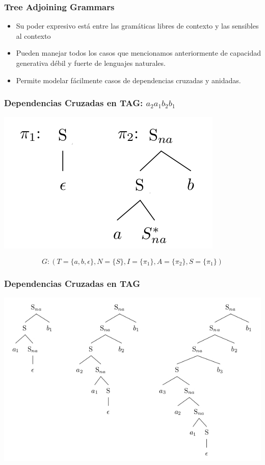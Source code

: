 \documentclass[compress,color=usenames]{beamer}
\begin{document}
\begin{frame}
\frametitle{Tree Adjoining Grammars}

\begin{itemize}
\item Su poder expresivo est\'a entre las gram\'aticas libres de contexto y 
las sensibles al contexto

\item Pueden manejar todos los casos que mencionamos anteriormente de capacidad
generativa d\'ebil y fuerte de lenguajes naturales. 

\item Permite modelar f\'acilmente casos de dependencias cruzadas y anidadas.

\end{itemize}
\end{frame}

\begin{frame}
\frametitle{Dependencias Cruzadas en TAG: $a_2a_1b_2b_1$}

\begin{center}
\includegraphics[scale=.4]{pics/pic2-4.jpg}
\end{center}

$$G : (T = \{a, b,\epsilon \}, N = \{S \}, I = \{\pi_1\}, A = \{\pi_2\}, S = \{\pi_1\})$$

\end{frame}

\begin{frame}
\frametitle{Dependencias Cruzadas en TAG}

\begin{center}
\includegraphics[scale=.4]{pics/pic2-5.jpg}
\end{center}


\end{frame}
\end{document}
